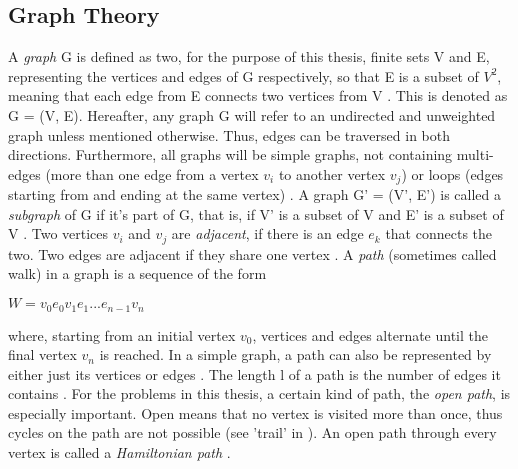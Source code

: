 \documentclass[12pt,a4paper]{article}
\begin{document}
\subsection{Graph Theory}

A \textit{graph} G is defined as two, for the purpose of this thesis, finite sets V and E, representing the vertices and edges of G respectively, so that E is a subset of $ V ^ 2$, meaning that each edge from E connects two vertices from V \citep[p. 1]{Bollobas1998}. This is denoted as G = (V, E). Hereafter, any graph G will refer to an undirected and unweighted graph unless mentioned otherwise. Thus, edges can be traversed in both directions. Furthermore, all graphs will be simple graphs, not containing multi-edges (more than one edge from a vertex $v_i$ to another vertex $v_j$) or loops (edges starting from and ending at the same vertex) \citep[pp. 3-4]{Gross2013}. 
\newline
\newline
A graph G' = (V', E') is called a \textit{subgraph} of G if it's part of G, that is, if V' is a subset of V and E' is a subset of V \citep[p. 2]{Bollobas1998}.
\newline
\newline
Two vertices $v_i$ and $v_j$ are \textit{adjacent}, if there is an edge $e_k$ that connects the two. Two edges are adjacent if they share one vertex \citep[p. 1-2]{Bollobas1998}. 
\newline
\newline
A \textit{path} (sometimes called walk) in a graph is a sequence of the form 
\begin{center}
	$ W = v_0 e_0 v_1 e_1...e_{n-1} v_n $
\end{center}
where, starting from an initial vertex $v_0$, vertices and edges alternate until the final vertex $v_n$ is reached. In a simple graph, a path can also be represented by either just its vertices \citep[p. 10]{Gross2013} or edges \citep[p. 4]{Bollobas1998}. The length l of a path is the number of edges it contains \citep[p. 5]{Bollobas1998}.
\newline
\newline
For the problems in this thesis, a certain kind of path, the \textit{open path}, is especially important. Open means that no vertex is visited more than once, thus cycles on the path are not possible (see 'trail' in \citep[p. 10]{Gross2013}). An open path through every vertex is called a \textit{Hamiltonian path} \citep[p. 14]{Bollobas1998}.
\newline
\newline
\end{document}
